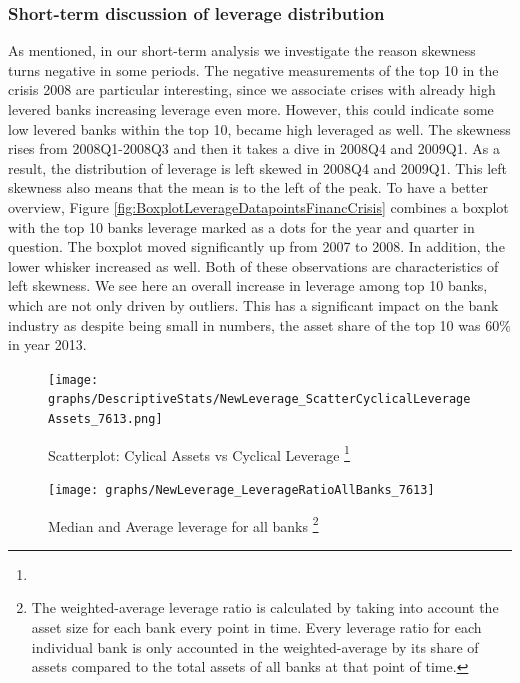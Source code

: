 \documentclass[12pt, a4paper]{article} %
\begin{document}
\subsubsection{Short-term discussion of leverage distribution}

As mentioned, in our short-term analysis we investigate the reason skewness turns negative in some periods. The negative measurements of the top 10 in the crisis 2008 are particular interesting, since we associate crises with already high levered banks increasing leverage even more. However, this could indicate some low levered banks within the top 10, became high leveraged as well.
The skewness rises from 2008Q1-2008Q3 and then it takes a dive in 2008Q4 and 2009Q1. As a result, the distribution of leverage is left skewed in 2008Q4 and 2009Q1. 
This left skewness also means that the mean is to the left of the peak. To have a better overview, Figure \ref{fig:BoxplotLeverageDatapointsFinancCrisis} combines a boxplot with the top 10 banks leverage marked as a dots for the year and quarter in question. The boxplot moved significantly up from 2007 to 2008. In addition, the lower whisker increased as well. Both of these observations are characteristics of left skewness. We see here an overall increase in leverage among top 10 banks, which are not only driven by outliers. This has a significant impact on the bank industry as despite being small in numbers, the asset share of the top 10 was $60\%$ in year 2013. 

\begin{figure}[hbtp]
\begin{minipage}{\textwidth}
\centering
\caption[1]{Scatterplot: Cylical Assets vs Cyclical Leverage \footnote{}}
\texttt{[image: graphs/DescriptiveStats/NewLeverage\_ScatterCyclicalLeverageAssets\_7613.png]}
\label{fig:ScatterCyclicalLeverageAssets}
\end{minipage}
\end{figure}


\begin{figure}[hbtp]
\begin{minipage}{\textwidth}
\centering
\caption[1]{Median and Average leverage for all banks \footnote{The weighted-average leverage ratio is calculated by taking into account the asset size for each bank every point in time. Every leverage ratio for each individual bank is only accounted in the weighted-average by its share of assets compared to the total assets of all banks at that point of time.}}
\texttt{[image: graphs/NewLeverage\_LeverageRatioAllBanks\_7613]}
\label{fig:averageLeverage}
\end{minipage}
\end{figure}
\end{document}
